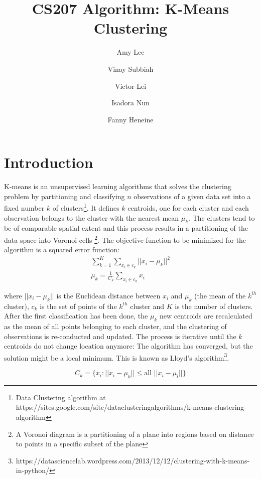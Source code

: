 \documentclass[11pt]{article}
\title{CS207 Algorithm: K-Means Clustering}
\author{Amy Lee \and Vinay Subbiah \and Victor Lei \and Isadora Nun \and Fanny Heneine}
\begin{document}
\maketitle{}

\pagestyle{plain}

\section*{Introduction}
K-means is an unsupervised learning algorithms that solves the clustering problem by partitioning and classifying $n$ observations of a given data set into a fixed number $k$ of clusters\footnote{Data Clustering algorithm at https://sites.google.com/site/dataclusteringalgorithms/k-means-clustering-algorithm}.
It defines $k$ centroids, one for each cluster and each observation belongs to the cluster with the nearest mean $\mu_k$. The clusters tend to be of comparable spatial extent and this process results in a partitioning of the data space into Voronoi cells \footnote{A Voronoi diagram is a partitioning of a plane into regions based on distance to points in a specific subset of the plane}. The objective function to be minimized for the algorithm is a squared error function:
\begin{gather}
\sum_{k=1}^{K}\sum_{x_i \in c_k}\Big|\Big|x_i-\mu_k\Big|\Big|^2 \\
\mu_k=\frac{1}{C_k}\sum_{x_i \in c_k} x_i
\end{gather}

\noindent where $\big|\big|x_i-\mu_k\big|\big|$ is the Euclidean distance between $x_i$ and $\mu_k$ (the mean of the $k^{th}$ cluster), $c_k$ is the set of points of the $k^{th}$ cluster and $K$ is the number of clusters. \\


\noindent After the first classification has been done, the $\mu_k$ new centroids are recalculated as the mean of all points belonging to each cluster, and the clustering of observations is re-conducted and updated. The process is iterative until the $k$ centroids do not change location anymore: The algorithm has converged, but the solution might be a local minimum. This is known as Lloyd’s algorithm\footnote{https://datasciencelab.wordpress.com/2013/12/12/clustering-with-k-means-in-python/}.


\begin{equation}
C_k=\{x_i: \big|\big|x_i-\mu_k\big|\big| \leq \text{all } \big|\big|x_i-\mu_l\big|\big|\}
\end{equation}
\end{document}
